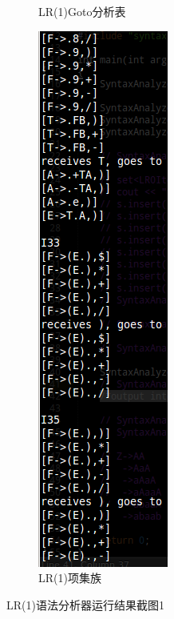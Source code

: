 \documentclass{article}
\begin{document}
\begin{CJK*}{UTF8}{gbsn}
\begin{figure}
\begin{subfigure}[b]{0.25\textwidth}
                \caption{LR(1)Goto分析表}
                \label{fig:ll1no}
        \end{subfigure}             
        \begin{subfigure}[b]{0.25\textwidth}
                \includegraphics[width=\textwidth]{lr1itemsetfamily.png}
                \caption{LR(1)项集族}
                \label{fig:ll1}
        \end{subfigure}                  
        \caption{LR(1)语法分析器运行结果截图1}\label{fig:lr1screenshot1}
\end{figure}


\end{CJK*}
\end{document}
